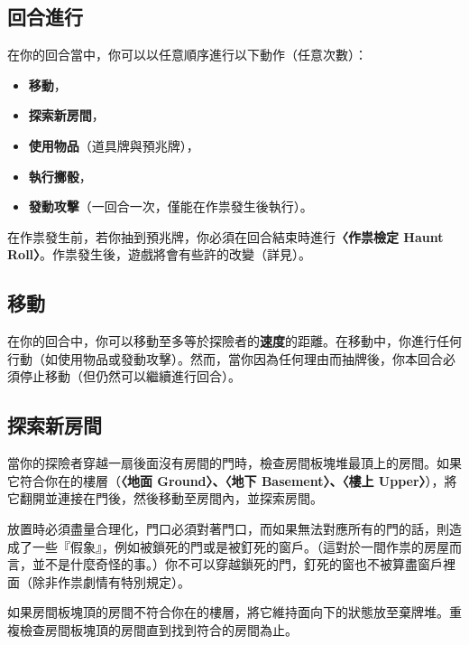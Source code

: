 
\subsection{回合進行}

在你的回合當中，你可以以任意順序進行以下動作（任意次數）：
\begin{itemize}
  \item \textbf{移動}，
  \item \textbf{探索新房間}，
  \item \textbf{使用物品}（道具牌與預兆牌），
  \item \textbf{執行擲骰}，
  \item \textbf{發動攻擊}（一回合一次，僅能在作祟發生後執行）。
\end{itemize}
在作祟發生前，若你抽到預兆牌，你必須在回合結束時進行\textbf{〈作祟檢定 Haunt Roll〉}。作祟發生後，遊戲將會有些許的改變（詳見）。


\subsection{移動}

在你的回合中，你可以移動至多等於探險者的\textbf{速度}的距離。在移動中，你進行任何行動（如使用物品或發動攻擊）。然而，當你因為任何理由而抽牌後，你本回合必須停止移動（但仍然可以繼續進行回合）。


\subsection{探索新房間}

當你的探險者穿越一扇後面沒有房間的門時，檢查房間板塊堆最頂上的房間。如果它符合你在的樓層（\textbf{〈地面 Ground〉、〈地下 Basement〉、〈樓上 Upper〉}），將它翻開並連接在門後，然後移動至房間內，並探索房間。

放置時必須盡量合理化，門口必須對著門口，而如果無法對應所有的門的話，則造成了一些『假象』，例如被鎖死的門或是被釘死的窗戶。（這對於一間作祟的房屋而言，並不是什麼奇怪的事。）你不可以穿越鎖死的門，釘死的窗也不被算盡窗戶裡面（除非作祟劇情有特別規定）。

如果房間板塊頂的房間不符合你在的樓層，將它維持面向下的狀態放至棄牌堆。重複檢查房間板塊頂的房間直到找到符合的房間為止。

